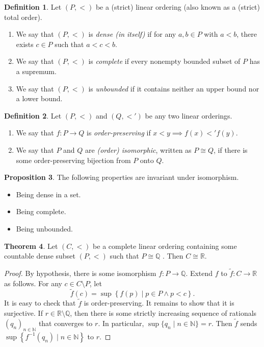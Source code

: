 \documentclass[10pt,letterpaper,cm]{nupset}
\theoremstyle{definition}
\newtheorem{definition}{Definition}[subsection]
\theoremstyle{theorem}
\newtheorem{theorem}[definition]{Theorem}
\newtheorem{prop}[definition]{Proposition}
\theoremstyle{remark}
\newcommand{\N}{\mathbb N}
\newcommand{\Q}{\mathbb Q}
\newcommand{\R}{\mathbb R}
\newcommand{\1}{\mathbf{1}}
\newcommand{\0}{\vec 0}
\begin{document}
\begin{definition} Let  $\left(P, <\right)$ be a (strict) linear ordering (also known as a (strict) total order).
\begin{enumerate}
\item We say that $\left(P, <\right)$  is \textit{dense (in itself)} if for any $a, b \in P$ with $a<b$, there exists   $c\in P$ such that $a<c<b$. 
\item We say that $\left(P, <\right)$ is \textit{complete} if every nonempty bounded subset of $P$ has a supremum. 
\item We say that $\left(P, <\right)$ is \textit{unbounded} if it contains neither an upper bound nor a lower bound. 
\end{enumerate}
\end{definition}

\begin{definition}
Let $\left(P, <\right)$ and $\left(Q, <'\right)$ be any two linear orderings. 
\begin{enumerate}
\item We say that $f : P \to Q$ is \textit{order-preserving} if $x< y \implies f(x) <' f(y)$.
\item We say that $P$ and $Q$ are \textit{(order) isomorphic}, written as $P\cong Q$, if there is some order-preserving bijection from $P$ onto $Q$.
\end{enumerate}
\end{definition}

\begin{prop}
The following  properties are invariant under isomorphism.
\begin{itemize}
\item Being dense in a set.
\item Being complete.
\item Being unbounded. 
\end{itemize}
\end{prop}

\begin{theorem}
 Let $\left(C, <\right)$ be a complete linear ordering  containing some countable dense subset $\left(P, <\right)$ such that $P \cong \Q$ . Then $C\cong \R$. 
\end{theorem}
\begin{proof} 
 By hypothesis, there is some isomorphism $f: P \to \Q$. Extend $f$ to $\tilde{f} : C \to \R$ as follows. For any $c \in C \setminus P$, let $$\tilde{f}(c)  = \sup\left\{f(p) \mid p\in P \land p < c\right\}.$$ It is easy to check that $\tilde{f}$ is order-preserving. It remains to show that it is surjective. If $r\in \R \setminus \Q$, then there is some strictly increasing sequence of rationals $\left(q_n\right)_{n\in \N}$ that converges to $r$. In particular, $\sup\{q_n \mid n\in \N\}  = r$. Then $\tilde{f}$ sends $\sup\left\{f^{-1}(q_n) \mid n \in \N\right\}$ to $r$.
\end{proof}
\end{document}
